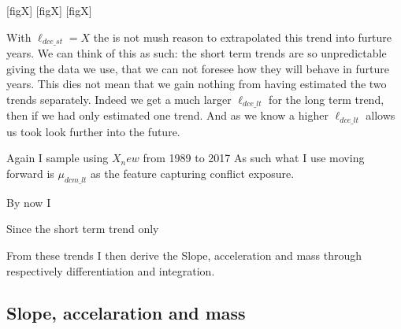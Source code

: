 \documentclass[a4paper]{article}
\begin{document}
[figX]
[figX]
[figX]

With $\ell_{dce\_st} = X$ the is not mush reason to extrapolated this trend into furture years. We can think of this as such: the short term trends are so unpredictable giving the data we use, that we can not foresee how they will behave in furture years. This dies not mean that we gain nothing from having estimated the two trends separately. Indeed we get a much larger $\ell_{dce\_lt}$ for the long term trend, then if we had only estimated one trend. And as we know a higher $\ell_{dce\_lt}$ allows us took look further into the future. 

Again I sample using $X_new$ from 1989 to 2017 As such what I use moving forward is $\mu_{dcm\_lt}$ as the feature capturing conflict exposure.\par




By now I


Since the short term trend only

From these trends I then derive the Slope, acceleration and mass through respectively differentiation and integration.\par

\subsection{Slope, accelaration and mass}








\end{document}
